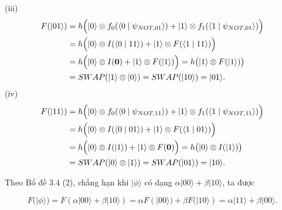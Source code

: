\documentclass[10pt]{article}
\begin{document}
(iii)
\[
\begin{aligned}
F(|01\rangle)
&= h\Bigl(|0\rangle \otimes f_{0}(\langle 0 \mid \psi_{N O T, 01}\rangle)
  + |1\rangle \otimes f_{1}(\langle 1 \mid \psi_{N O T, 01}\rangle)\Bigr) \\
&= h\Bigl(|0\rangle \otimes I(\langle 0 \mid 11\rangle)
  + |1\rangle \otimes F(\langle 1 \mid 11\rangle)\Bigr) \\
&= h\Bigl(|0\rangle \otimes I(\mathbf{0}) + |1\rangle \otimes F(|1\rangle)\Bigr)
 = h\bigl(|1\rangle \otimes F(|1\rangle)\bigr) \\
&= S W A P(|1\rangle \otimes |0\rangle)=S W A P(|10\rangle)=|01\rangle.
\end{aligned}
\]
(iv)
\[
\begin{aligned}
F(|11\rangle)
&= h\Bigl(|0\rangle \otimes f_{0}(\langle 0 \mid \psi_{N O T, 11}\rangle)
  + |1\rangle \otimes f_{1}(\langle 1 \mid \psi_{N O T, 11}\rangle)\Bigr) \\
&= h\Bigl(|0\rangle \otimes I(\langle 0 \mid 01\rangle)
  + |1\rangle \otimes F(\langle 1 \mid 01\rangle)\Bigr) \\
&= h\Bigl(|0\rangle \otimes I(|1\rangle) + |1\rangle \otimes F(\mathbf{0})\Bigr)
 = h\bigl(|0\rangle \otimes I(|1\rangle)\bigr) \\
&= S W A P(|0\rangle \otimes |1\rangle)=S W A P(|01\rangle)=|10\rangle.
\end{aligned}
\]

Theo Bổ đề 3.4 (2), chẳng hạn khi $|\phi\rangle$ có dạng $\alpha|00\rangle+\beta|10\rangle$, ta được

$$
F(|\phi\rangle)=F(\alpha|00\rangle+\beta|10\rangle)=\alpha F(|00\rangle)+\beta F(|10\rangle)=\alpha|11\rangle+\beta|00\rangle .
$$
\end{document}
